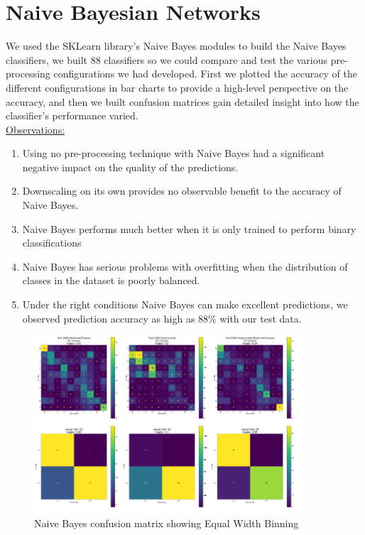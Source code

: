 \documentclass[11pt]{article}
\begin{document}
\section{Naive Bayesian Networks}\label{sec:NaiveBayse}
We used the SKLearn library's Naive Bayes modules to build the Naive Bayes classifiers, we built 88 classifiers so we could compare and test the various pre-processing configurations we had developed. 
First we plotted the accuracy of the different configurations in bar charts to provide a high-level perspective on the accuracy, and then we built confusion matrices gain detailed insight into how the classifier's performance varied.\\
\underline{Observations:}
\begin{enumerate}
    \item Using no pre-processing technique with Naive Bayes had a significant negative impact on the quality of the predictions.
    \item Downscaling on its own provides no observable benefit to the accuracy of Naive Bayes.
    \item Naive Bayes performs much better when it is only trained to perform binary classifications
    \item Naive Bayes has serious problems with overfitting when the distribution of classes in the dataset is poorly balanced.
    \item Under the right conditions Naive Bayes can make excellent predictions, we observed prediction accuracy as high as 88\% with our test data.
\end{enumerate}

\begin{figure}[H]
  \centering
  \includegraphics[width=0.9\textwidth]{Images/NaiveBayesEWBMatrices.png}
  \caption{Naive Bayes confusion matrix showing Equal Width Binning}
  \label{fig:NaiveBayesEWBConfMat}
\end{figure}
\end{document}
